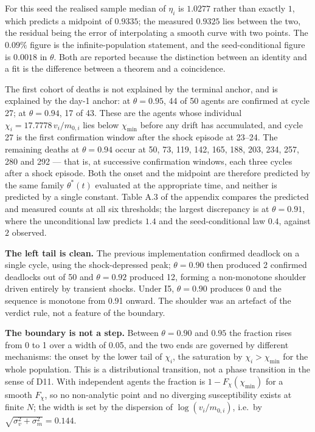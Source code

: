 \documentclass[11pt,a4paper]{article}
\begin{document}
For this seed the realised sample median of \(\eta_i\) is \(1.0277\) rather than
exactly \(1\), which predicts a midpoint of \(0.9335\); the measured \(0.9325\) lies
between the two, the residual being the error of interpolating a smooth curve with
two points. The \(0.09\%\) figure is the infinite-population statement, and the
seed-conditional figure is \(0.0018\) in \(\theta\). Both are reported because the
distinction between an identity and a fit is the difference between a theorem and
a coincidence.

The first cohort of deaths is not explained by the terminal anchor, and is
explained by the day-1 anchor: at \(\theta=0.95\), 44 of 50 agents are confirmed at
cycle 27; at \(\theta=0.94\), 17 of 43. These are the agents whose individual
\(\chi_i=17.7778\,v_i/m_{0,i}\) lies below \(\chi_{\min}\) before any drift has
accumulated, and cycle 27 is the first confirmation window after the shock
episode at 23--24. The remaining deaths at \(\theta=0.94\) occur at 50, 73, 119,
142, 165, 188, 203, 234, 257, 280 and 292 --- that is, at successive confirmation
windows, each three cycles after a shock episode. Both the onset and the midpoint
are therefore predicted by the same family \(\theta^\ast(t)\) evaluated at the
appropriate time, and neither is predicted by a single constant. Table A.3 of the
appendix compares the predicted and measured counts at all six thresholds; the
largest discrepancy is at \(\theta=0.91\), where the unconditional law predicts
\(1.4\) and the seed-conditional law \(0.4\), against \(2\) observed.

\textbf{The left tail is clean.} The previous implementation confirmed deadlock on a
single cycle, using the shock-depressed peak; \(\theta=0.90\) then produced 2
confirmed deadlocks out of 50 and \(\theta=0.92\) produced 12, forming a
non-monotone shoulder driven entirely by transient shocks. Under I5, \(\theta=0.90\)
produces 0 and the sequence is monotone from 0.91 onward. The shoulder was an
artefact of the verdict rule, not a feature of the boundary.

\textbf{The boundary is not a step.} Between \(\theta=0.90\) and \(0.95\) the fraction
rises from 0 to 1 over a width of 0.05, and the two ends are governed by different
mechanisms: the onset by the lower tail of \(\chi_i\), the saturation by
\(\chi_i>\chi_{\min}\) for the whole population. This is a distributional transition,
not a phase transition in the sense of D11. With independent agents the fraction
is \(1-F_\chi(\chi_{\min})\) for a smooth \(F_\chi\), so no non-analytic point and no
diverging susceptibility exists at finite \(N\); the width is set by the dispersion
of \(\log(v_i/m_{0,i})\), i.e.~by \(\sqrt{\sigma_v^2+\sigma_m^2}=0.144\).
\end{document}
